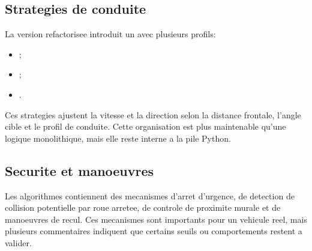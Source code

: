 \subsection{Strategies de conduite}

La version refactorisee introduit un  avec plusieurs profils:

\begin{itemize}
  \item {};
  \item {};
  \item {}.
\end{itemize}

Ces strategies ajustent la vitesse et la direction selon la distance frontale, l'angle cible et le profil de conduite. Cette organisation est plus maintenable qu'une logique monolithique, mais elle reste interne a la pile Python.

\subsection{Securite et manoeuvres}

Les algorithmes contiennent des mecanismes d'arret d'urgence, de detection de collision potentielle par roue arretee, de controle de proximite murale et de manoeuvres de recul. Ces mecanismes sont importants pour un vehicule reel, mais plusieurs commentaires  indiquent que certains seuils ou comportements restent a valider.

